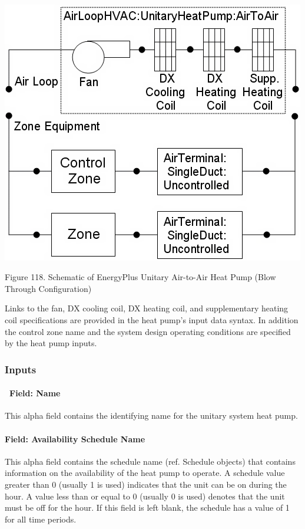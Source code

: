 ~\includegraphics{media/image300.png}

Figure 118. Schematic of EnergyPlus Unitary Air-to-Air Heat Pump (Blow Through Configuration)

Links to the fan, DX cooling coil, DX heating coil, and supplementary heating coil specifications are provided in the heat pump's input data syntax. In addition the control zone name and the system design operating conditions are specified by the heat pump inputs.

\subsubsection{Inputs}\label{inputs-3-039}

\paragraph{~Field: Name}\label{field-name-4-031}

This alpha field contains the identifying name for the unitary system heat pump.

\paragraph{Field: Availability Schedule Name}\label{field-availability-schedule-name-3-006}

This alpha field contains the schedule name (ref. Schedule objects) that contains information on the availability of the heat pump to operate. A schedule value greater than 0 (usually 1 is used) indicates that the unit can be on during the hour. A value less than or equal to 0 (usually 0 is used) denotes that the unit must be off for the hour. If this field is left blank, the schedule has a value of 1 for all time periods.

